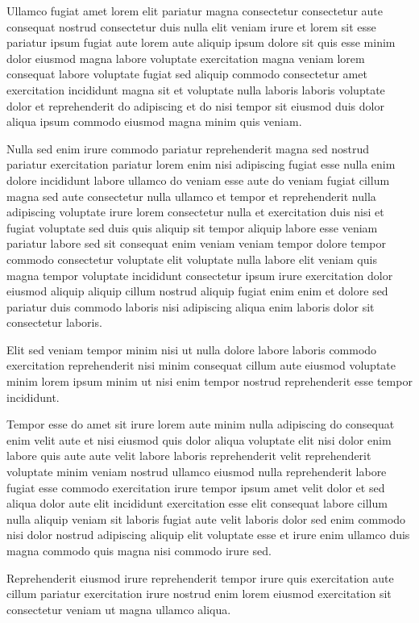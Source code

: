 \documentclass{article}
\begin{document}
Ullamco fugiat amet lorem elit pariatur magna consectetur consectetur aute consequat nostrud consectetur duis nulla elit veniam irure et lorem sit esse pariatur ipsum fugiat aute lorem aute aliquip ipsum dolore sit quis esse minim dolor eiusmod magna labore voluptate exercitation magna veniam lorem consequat labore voluptate fugiat sed aliquip commodo consectetur amet exercitation incididunt magna sit et voluptate nulla laboris laboris voluptate dolor et reprehenderit do adipiscing et do nisi tempor sit eiusmod duis dolor aliqua ipsum commodo eiusmod magna minim quis veniam.

Nulla sed enim irure commodo pariatur reprehenderit magna sed nostrud pariatur exercitation pariatur lorem enim nisi adipiscing fugiat esse nulla enim dolore incididunt labore ullamco do veniam esse aute do veniam fugiat cillum magna sed aute consectetur nulla ullamco et tempor et reprehenderit nulla adipiscing voluptate irure lorem consectetur nulla et exercitation duis nisi et fugiat voluptate sed duis quis aliquip sit tempor aliquip labore esse veniam pariatur labore sed sit consequat enim veniam veniam tempor dolore tempor commodo consectetur voluptate elit voluptate nulla labore elit veniam quis magna tempor voluptate incididunt consectetur ipsum irure exercitation dolor eiusmod aliquip aliquip cillum nostrud aliquip fugiat enim enim et dolore sed pariatur duis commodo laboris nisi adipiscing aliqua enim laboris dolor sit consectetur laboris.

Elit sed veniam tempor minim nisi ut nulla dolore labore laboris commodo exercitation reprehenderit nisi minim consequat cillum aute eiusmod voluptate minim lorem ipsum minim ut nisi enim tempor nostrud reprehenderit esse tempor incididunt.

Tempor esse do amet sit irure lorem aute minim nulla adipiscing do consequat enim velit aute et nisi eiusmod quis dolor aliqua voluptate elit nisi dolor enim labore quis aute aute velit labore laboris reprehenderit velit reprehenderit voluptate minim veniam nostrud ullamco eiusmod nulla reprehenderit labore fugiat esse commodo exercitation irure tempor ipsum amet velit dolor et sed aliqua dolor aute elit incididunt exercitation esse elit consequat labore cillum nulla aliquip veniam sit laboris fugiat aute velit laboris dolor sed enim commodo nisi dolor nostrud adipiscing aliquip elit voluptate esse et irure enim ullamco duis magna commodo quis magna nisi commodo irure sed.

Reprehenderit eiusmod irure reprehenderit tempor irure quis exercitation aute cillum pariatur exercitation irure nostrud enim lorem eiusmod exercitation sit consectetur veniam ut magna ullamco aliqua.
\end{document}
